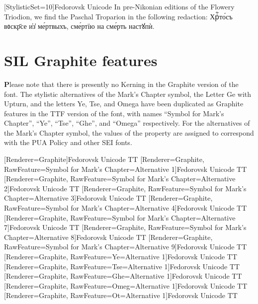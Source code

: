 \newfontfamily{\base}[StylisticSet=10]{Fedorovsk Unicode}
{\Large \base
In pre-Nikonian editions of the Flowery Triodion, we find the Paschal Troparion in the following redaction: Хрⷭ҇то́съ вᲂскр҃се и҆з̾ ме́ртвыхъ, сме́ртїю на сме́рть настꙋпѝ.
}

\section{SIL Graphite features}

{\textbf Please note} that there is presently no Kerning in the Graphite version of the font. The stylistic alternatives of the Mark's Chapter symbol, the Letter Ge with Upturn, and the letters Ye, Tse, and Omega have been duplicated as Graphite features in the TTF version of the font, with names ``Symbol for Mark's Chapter'', ``Ye'', ``Tse'', ``Ghe'', and ``Omega'' respectively. For the alternatives of the Mark's Chapter symbol, the values of the property are assigned to correspond with the PUA Policy and other SEI fonts.

\newfontfamily{\graph}[Renderer=Graphite]{Fedorovsk Unicode TT}
\newfontfamily{\graphA}[Renderer=Graphite, RawFeature={Symbol for Mark's Chapter=Alternative 1}]{Fedorovsk Unicode TT}
\newfontfamily{\graphB}[Renderer=Graphite, RawFeature={Symbol for Mark's Chapter=Alternative 2}]{Fedorovsk Unicode TT}
\newfontfamily{\graphC}[Renderer=Graphite, RawFeature={Symbol for Mark's Chapter=Alternative 3}]{Fedorovsk Unicode TT}
\newfontfamily{\graphD}[Renderer=Graphite, RawFeature={Symbol for Mark's Chapter=Alternative 4}]{Fedorovsk Unicode TT}
\newfontfamily{\graphE}[Renderer=Graphite, RawFeature={Symbol for Mark's Chapter=Alternative 7}]{Fedorovsk Unicode TT}
\newfontfamily{\graphF}[Renderer=Graphite, RawFeature={Symbol for Mark's Chapter=Alternative 8}]{Fedorovsk Unicode TT}
\newfontfamily{\graphG}[Renderer=Graphite, RawFeature={Symbol for Mark's Chapter=Alternative 9}]{Fedorovsk Unicode TT}
\newfontfamily{\graphYe}[Renderer=Graphite, RawFeature={Ye=Alternative 1}]{Fedorovsk Unicode TT}
\newfontfamily{\graphTse}[Renderer=Graphite, RawFeature={Tse=Alternative 1}]{Fedorovsk Unicode TT}
\newfontfamily{\graphGhe}[Renderer=Graphite, RawFeature={Ghe=Alternative 1}]{Fedorovsk Unicode TT}
\newfontfamily{\graphOmega}[Renderer=Graphite, RawFeature={Omeg=Alternative 1}]{Fedorovsk Unicode TT}
\newfontfamily{\graphOt}[Renderer=Graphite, RawFeature={Ot=Alternative 1}]{Fedorovsk Unicode TT}

